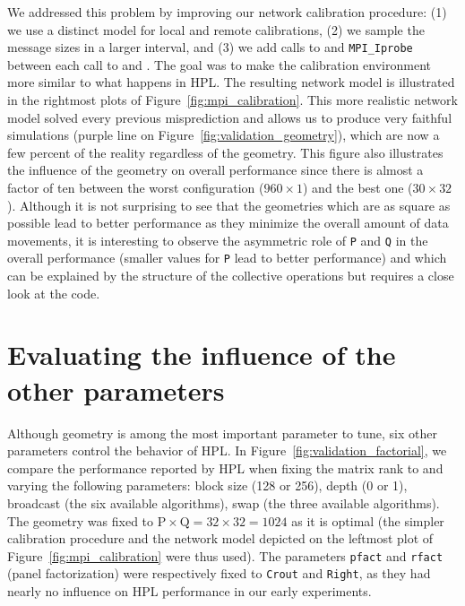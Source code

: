         We addressed this problem by improving our network calibration procedure: (1) we use a distinct model for local
        and remote calibrations, (2) we sample the message sizes in a larger interval, and (3) we add calls to \dgemm
        and \texttt{MPI\_Iprobe} between each call to \send and \recv. The goal was to make the calibration environment
        more similar to what happens in HPL\@.  The resulting network model is illustrated in the rightmost plots of
        Figure~\ref{fig:mpi_calibration}.  This more realistic network model solved every previous misprediction and
        allows us to produce very faithful simulations (purple line on Figure~\ref{fig:validation_geometry}), which are
        now a few percent of the reality regardless of the geometry.  This figure also illustrates the influence of the
        geometry on overall performance since there is almost a factor of ten between the worst configuration
        (\(960\times1\)) and the best one (\(30\times32\)). Although it is not surprising to see that the geometries
        which are as square as possible lead to better performance as they minimize the overall amount of data
        movements, it is interesting to observe the asymmetric role of \texttt{P} and \texttt{Q} in the overall
        performance (smaller values for \texttt{P} lead to better performance) and which can be explained by the
        structure of the collective operations but requires a close look at the code.

    \section{Evaluating the influence of the other parameters}%
    \label{sec:factorial_experiment}

        Although geometry is among the most important parameter to tune, six other parameters control the behavior of
        HPL. In Figure~\ref{fig:validation_factorial}, we compare the performance reported by HPL when fixing the matrix
        rank to  and varying the following parameters: block size (128 or 256), depth (0 or 1), broadcast
        (the six available algorithms), swap (the three available algorithms). The geometry was fixed to
        \(\text{P}\times\text{Q}=32\times32=1024\) as it is optimal (the simpler calibration procedure and the network
        model depicted on the leftmost plot of Figure~\ref{fig:mpi_calibration} were thus used). The parameters
        \texttt{pfact} and \texttt{rfact} (panel factorization) were respectively fixed to \texttt{Crout} and
        \texttt{Right}, as they had nearly no influence on HPL performance in our early experiments.

